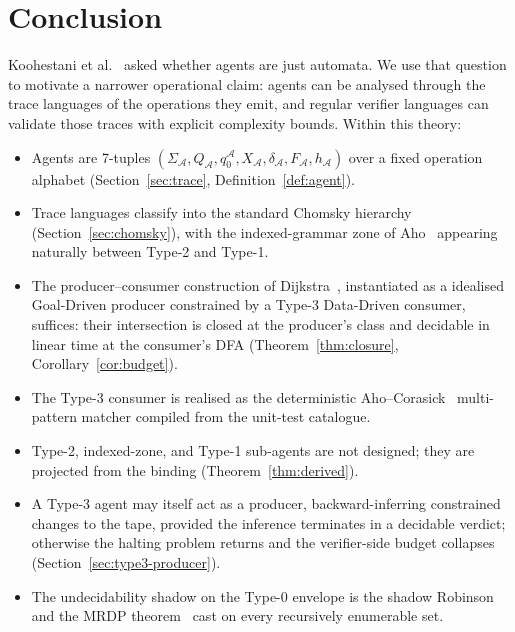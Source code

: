 \section{Conclusion}
\label{sec:conclusion}

Koohestani et al.~\cite{koohestani2025automata} asked whether
agents are just automata.  We use that question to motivate a
narrower operational claim: agents can be analysed through the
trace languages of the operations they emit, and regular verifier
languages can validate those traces with explicit complexity
bounds.  Within this theory:
\begin{itemize}
\item Agents are 7-tuples
$(\Sigma_\mathcal{A},Q_\mathcal{A},q_0^\mathcal{A},X_\mathcal{A},
\delta_\mathcal{A},F_\mathcal{A},h_\mathcal{A})$ over a fixed
operation alphabet
(Section~\ref{sec:trace}, Definition~\ref{def:agent}).
\item Trace languages classify into the standard
Chomsky hierarchy (Section~\ref{sec:chomsky}), with the
indexed-grammar zone of Aho~\cite{aho1968indexed}
appearing naturally between Type-2 and Type-1.
\item The producer--consumer construction of
Dijkstra~\cite{dijkstra1968cooperating}, instantiated as a
idealised Goal-Driven producer constrained by a Type-3 Data-Driven
consumer, suffices: their intersection is closed at the
producer's class and decidable in linear time at the consumer's
DFA (Theorem~\ref{thm:closure},
Corollary~\ref{cor:budget}).
\item The Type-3 consumer is realised as the deterministic
Aho--Corasick~\cite{aho1975corasick} multi-pattern matcher
compiled from the unit-test catalogue.
\item Type-2, indexed-zone, and Type-1 sub-agents are not
designed; they are projected from the binding
(Theorem~\ref{thm:derived}).
\item A Type-3 agent may itself act as a producer,
backward-inferring constrained changes to the tape, provided the
inference terminates in a decidable verdict; otherwise the
halting problem returns and the verifier-side budget collapses
(Section~\ref{sec:type3-producer}).
\item The undecidability shadow on the Type-0 envelope is the
shadow Robinson and the MRDP
theorem~\cite{robinson1949definability,davis1961decision} cast
on every recursively enumerable set.
\end{itemize}


